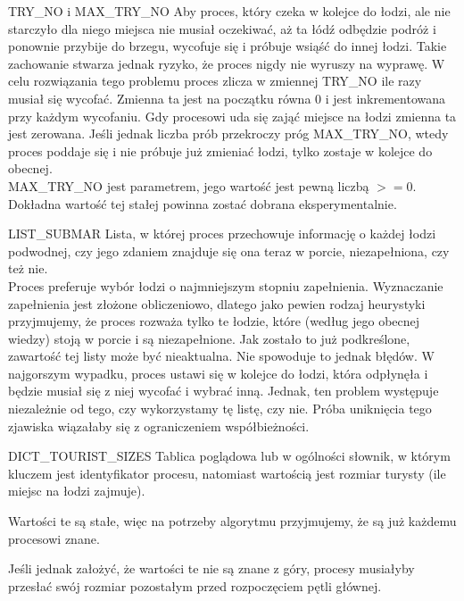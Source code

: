 \documentclass{beamer}
\begin{document}
\begin{frame}{TRY\_NO i MAX\_TRY\_NO}
    \internallinenumbers
    \resetlinenumber[1]
    Aby proces, który czeka w kolejce do łodzi, ale nie starczyło dla niego miejsca nie musiał oczekiwać, aż ta łódź odbędzie podróż i ponownie przybije do brzegu, wycofuje się i próbuje wsiąść do innej łodzi.
    Takie zachowanie stwarza jednak ryzyko, że proces nigdy nie wyruszy na wyprawę. W celu rozwiązania tego problemu proces zlicza w zmiennej TRY\_NO ile razy musiał się wycofać. Zmienna ta jest na początku równa 0 i jest inkrementowana przy każdym wycofaniu. Gdy procesowi uda się zająć miejsce na łodzi zmienna ta jest zerowana. Jeśli jednak liczba prób przekroczy próg MAX\_TRY\_NO, wtedy proces poddaje się i nie próbuje już zmieniać łodzi, tylko zostaje w kolejce do obecnej. \\
    MAX\_TRY\_NO jest parametrem, jego wartość jest pewną liczbą $>=0$. Dokładna wartość tej stałej powinna zostać dobrana eksperymentalnie.
\end{frame}

\begin{frame}{LIST\_SUBMAR}
    \internallinenumbers
    \resetlinenumber[1]
    Lista, w której proces przechowuje informację o każdej łodzi podwodnej, czy jego zdaniem znajduje się ona teraz w porcie, niezapełniona, czy też nie. \\
    Proces preferuje wybór łodzi o najmniejszym stopniu zapełnienia. Wyznaczanie zapełnienia jest złożone obliczeniowo, dlatego jako pewien rodzaj heurystyki przyjmujemy, że proces rozważa tylko te łodzie, które (według jego obecnej wiedzy) stoją w porcie i są niezapełnione. 
    Jak zostało to już podkreślone, zawartość tej listy może być nieaktualna. Nie spowoduje to jednak błędów. W najgorszym wypadku, proces ustawi się w kolejce do łodzi, która odpłynęła i będzie musiał się z niej wycofać i wybrać inną. Jednak, ten problem występuje niezależnie od tego, czy wykorzystamy tę listę, czy nie. Próba uniknięcia tego zjawiska wiązałaby się z ograniczeniem współbieżności.
\end{frame}

\begin{frame}{DICT\_TOURIST\_SIZES}
    \internallinenumbers
    \resetlinenumber[1]
    Tablica poglądowa lub w ogólności słownik, w którym kluczem jest identyfikator procesu, natomiast wartością jest rozmiar turysty (ile miejsc na łodzi zajmuje). 

    \vspace{0.4cm}
    Wartości te są stałe, więc na potrzeby algorytmu przyjmujemy, że są już każdemu procesowi znane.

    \vspace{0.4cm}
    Jeśli jednak założyć, że wartości te nie są znane z góry, procesy musiałyby przesłać swój rozmiar pozostałym przed rozpoczęciem pętli głównej.
\end{frame}
\end{document}
